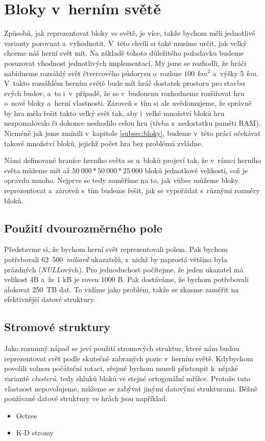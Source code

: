 \section{Bloky v~herním světě}
\label{sec:blocksWorld}

Způsobů, jak reprezentovat bloky ve světě, je více, takže bychom měli jednotlivé varianty porovnat a~vyhodnotit. V~této chvíli si také musíme určit, jak velký chceme náš herní svět mít. Na základě tohoto důležitého požadavku budeme posuzovat vhodnost jednotlivých implementací. My jsme se rozhodli, že hráči nabídneme rozsáhlý svět čtvercového půdorysu o~rozloze $100\,\ km^2$ a~výšky $5\,\ km$. V~takto rozsáhlém herním světě bude mít hráč dostatek prostoru pro stavbu svých budov, a~to i~v~případě, že se v~budoucnu rozhodneme rozšiřovat hru o~nové bloky a~herní vlastnosti. Zároveň s~tím si ale uvědomujeme, že správně by hra měla řešit takto velký svět tak, aby i~velké množství bloků hru nezpomalovalo či dokonce neshodilo celou hru (třeba z~nedostatku paměti RAM). Nicméně jak jsme zmínili v~kapitole \ref{subsec:bloky}, budeme v~této práci očekávat takové množství bloků, jejichž počet hra bez problémů zvládne.

Námi definované hranice herního světa se u~bloků projeví tak, že v~rámci herního světa můžeme mít až $50~000 * 50~000 * 25~000$ bloků jednotkové velikosti, což je opravdu mnoho. Nejprve se tedy zaměříme na to, jak vůbec můžeme bloky reprezentovat a~zároveň s~tím budeme řešit, jak se vypořádat s~různými rozměry bloků.

\subsection{Použití dvourozměrného pole}

Představme si, že bychom herní svět reprezentovali polem. Pak bychom potřebovali 62~500~\textit{miliard} ukazatelů, z~nichž by naprostá většina byla prázdných (\textit{NULL}ových). Pro jednoduchost počítejme, že jeden ukazatel má velikost 4B a~že 1 kB je roven 1000 B. Pak dostáváme, že bychom potřebovali alokovat 250~TB dat. To vidíme jako problém, takže se zkusme zaměřit na efektivnější datové struktury.

\subsection{Stromové struktury}
\label{subsec:trees}

Jako rozumný nápad se jeví použití stromových struktur, které nám budou reprezentovat svět podle skutečně zabraných pozic v~herním světě. Kdybychom povolili volnou počáteční rotaci, zřejmě bychom museli přistoupit k~nějaké variantě \textit{clusterů}, tedy shluků bloků ve stejné ortogonální mřížce. Protože tuto vlastnost nepovolujeme, můžeme se zabývat jinými datovými strukturami. Běžně používané datové struktury ve hrách jsou například:
\pagebreak
\begin{itemize}
	\item Octree
	\item K-D stromy
\end{itemize}

